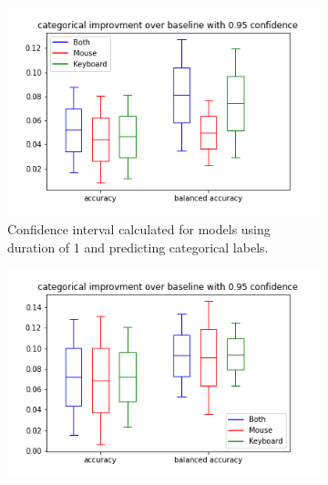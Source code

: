 \documentclass[../main.tex]{subfiles}
\begin{document}
\begin{figure}[!h]
    \centering


    \begin{subfigure}[b]{0.31\textwidth}
        \centering
        \includegraphics[width=\textwidth]{figures/results/interval_difference/1/1_categorical_0.95.png}
        \captionsetup{justification=centering}
        \caption{Confidence interval calculated for models using duration of 1 and predicting categorical labels.}
    \end{subfigure}
    \hfill
    \begin{subfigure}[b]{0.31\textwidth}
        \centering
        \includegraphics[width=\textwidth]{figures/results/interval_difference/5/5_categorical_0.95.png}
        \captionsetup{justification=centering}

\end{subfigure}
\end{figure}
\end{document}
